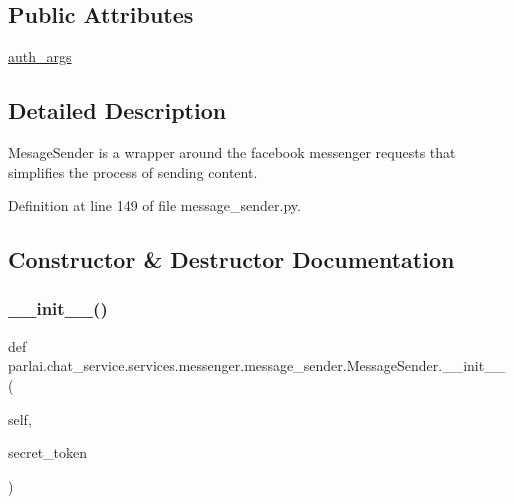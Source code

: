 \subsection*{Public Attributes}
\begin{DoxyCompactItemize}
\item 
\hyperlink{classparlai_1_1chat__service_1_1services_1_1messenger_1_1message__sender_1_1MessageSender_a748eb4858eed560aba381963050ad4b1}{auth\+\_\+args}
\end{DoxyCompactItemize}


\subsection{Detailed Description}
\begin{DoxyVerb}MesageSender is a wrapper around the facebook messenger requests that simplifies the
process of sending content.
\end{DoxyVerb}
 

Definition at line 149 of file message\+\_\+sender.\+py.



\subsection{Constructor \& Destructor Documentation}
\mbox{\label{classparlai_1_1chat__service_1_1services_1_1messenger_1_1message__sender_1_1MessageSender_aaedf425b46271ec9c4b36f4b01914496}} 
\subsubsection{\texorpdfstring{\+\_\+\+\_\+init\+\_\+\+\_\+()}{\_\_init\_\_()}}
{\footnotesize\ttfamily def parlai.\+chat\+\_\+service.\+services.\+messenger.\+message\+\_\+sender.\+Message\+Sender.\+\_\+\+\_\+init\+\_\+\+\_\+ (\begin{DoxyParamCaption}\item[{}]{self,  }\item[{}]{secret\+\_\+token }\end{DoxyParamCaption})}

